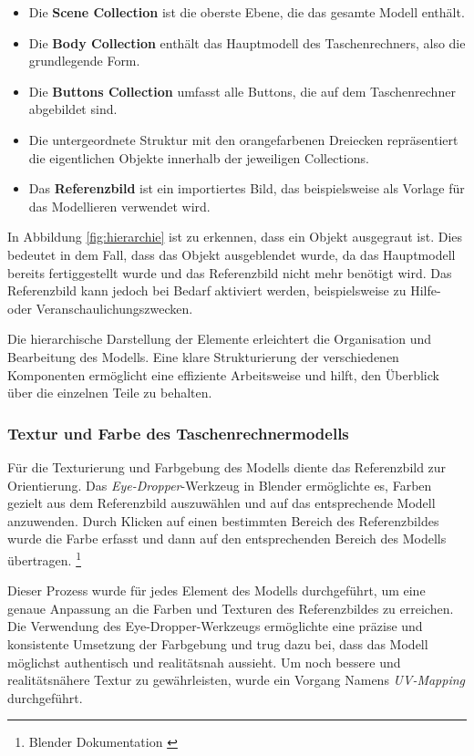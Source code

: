 \begin{itemize}
    \item Die \textbf{Scene Collection} ist die oberste Ebene, die das gesamte Modell enthält.
    \item Die \textbf{Body Collection} enthält das Hauptmodell des Taschenrechners, also die grundlegende Form.
    \item Die \textbf{Buttons Collection} umfasst alle Buttons, die auf dem Taschenrechner abgebildet sind.
    \item Die untergeordnete Struktur mit den orangefarbenen Dreiecken repräsentiert die eigentlichen Objekte innerhalb der jeweiligen Collections.
    \item Das \textbf{Referenzbild} ist ein importiertes Bild, das beispielsweise als Vorlage für das Modellieren verwendet wird.
\end{itemize}

In Abbildung \ref{fig:hierarchie} ist zu erkennen, dass ein Objekt ausgegraut ist. Dies bedeutet in dem Fall, dass das Objekt ausgeblendet wurde, da das Hauptmodell bereits fertiggestellt wurde und das Referenzbild nicht mehr benötigt wird. Das Referenzbild kann jedoch bei Bedarf aktiviert werden, beispielsweise zu Hilfe- oder Veranschaulichungszwecken.

Die hierarchische Darstellung der Elemente erleichtert die Organisation und Bearbeitung des Modells. Eine klare Strukturierung der verschiedenen Komponenten ermöglicht eine effiziente Arbeitsweise und hilft, den Überblick über die einzelnen Teile zu behalten.

\subsubsection*{Textur und Farbe des Taschenrechnermodells}
Für die Texturierung und Farbgebung des Modells diente das Referenzbild zur Orientierung. Das \textit{Eye-Dropper}-Werkzeug in Blender ermöglichte es, Farben gezielt aus dem Referenzbild auszuwählen und auf das entsprechende Modell anzuwenden. Durch Klicken auf einen bestimmten Bereich des Referenzbildes wurde die Farbe erfasst und dann auf den entsprechenden Bereich des Modells übertragen. \footnote{Blender Dokumentation \cite{Eyedropper Werkzeug}}

Dieser Prozess wurde für jedes Element des Modells durchgeführt, um eine genaue Anpassung an die Farben und Texturen des Referenzbildes zu erreichen. Die Verwendung des Eye-Dropper-Werkzeugs ermöglichte eine präzise und konsistente Umsetzung der Farbgebung und trug dazu bei, dass das Modell möglichst authentisch und realitätsnah aussieht. Um noch bessere und realitätsnähere Textur zu gewährleisten, wurde ein Vorgang Namens \textit{UV-Mapping} durchgeführt.


